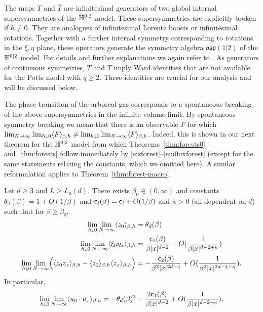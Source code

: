 \documentclass[11pt]{amsart}
\numberwithin{equation}{section}
\numberwithin{theorem}{section}
\newcommand{\1}{{\bf 1}}
\newcommand{\consta}{{\sf c}_1}
\newcommand{\constb}{{\sf c}_2}
\begin{document}
The maps $T$ and $\bar T$ are infinitesimal generators of two global
internal supersymmetries of the $\mathbb{H}^{0|2}$ model.  These
supersymmetries are explicitly broken if $h \neq 0$.  They are
analogues of infinitesimal Lorentz boosts or infinitesimal
rotations. Together with a further internal symmetry corresponding to
rotations in the $\xi, \eta$ plane, these operators generate the
symmetry algebra $\mathfrak{osp}(1|2)$ of the $\mathbb{H}^{0|2}$ model.  For
details and further explanations we again refer to
\cite[Section~2.2]{MR4218682}.  As generators of continuous
symmetries, $T$ and $\bar T$ imply Ward identities that are not
available for the Potts model with $q\geq 2$. These identities are
crucial for our analysis and will be discussed below.

The phase transition of the arboreal gas corresponds to a spontaneous
breaking of the above supersymmetries in the infinite volume
limit. By spontaneous symmetry breaking we mean that there is
an observable $F$ for which
$\lim_{N\to\infty}\lim_{h\downarrow 0}\langle F \rangle_{\beta,h}\neq \lim_{h\downarrow 0}\lim_{N\to\infty}\langle F \rangle_{\beta,h}$.
Indeed, this is shown in our next theorem for the $\mathbb{H}^{0|2}$ model from which
Theorems~\ref{thm:forests0} and~\ref{thm:forests} follow immediately
by \eqref{e:zforest}--\eqref{e:u0uxforest} (except for the same
statements relating the constants, which we omitted here). A similar
reformulation applies to Theorem~\ref{thm:forest-macro}.

\begin{theorem}\label{thm:h02}
  Let $d\geq 3$ and $L\geq L_0(d)$. There exists  $\beta_0\in (0,\infty)$ and constants $\theta_d(\beta)=1+O(1/\beta)$
  and ${\sf c}_i(\beta) = {\sf c}_i+O(1/\beta)$ and $\kappa >0$ (all dependent on $d$)
  such that for $\beta \geq \beta_0$,
  \begin{align}
    \lim_{h\downarrow 0}\lim_{N\to\infty}\avg{z_0}_{\beta,h}
    &= \theta_d(\beta)
    \\
    \lim_{h\downarrow 0}\lim_{N\to\infty}
    \avg{\xi_0\eta_x}_{\beta,h}
    &= \frac{\consta(\beta)}{\beta |x|^{d-2}} + O(\frac{1}{\beta |x|^{d-2+\kappa}})
    \\
    \lim_{h\downarrow 0}\lim_{N\to\infty}\pB{\avg{z_0z_x}_{\beta,h}-\avg{z_0}_{\beta,h} \avg{z_x}_{\beta,h}}
    &= -\frac{\constb(\beta)}{\beta^2 |x|^{2d-4}} + O(\frac{1}{\beta^2|x|^{2d-4+\kappa}})
      .
  \end{align}
  In particular,
  \begin{equation}
    \lim_{h\downarrow 0}\lim_{N\to\infty}
    \avg{u_0\cdot u_x}_{\beta,h} = -\theta_d(\beta)^2 -\frac{2\consta(\beta)}{\beta |x|^{d-2}} + O(\frac{1}{\beta |x|^{d-2+\kappa}}).
  \end{equation}
\end{theorem}
\end{document}
